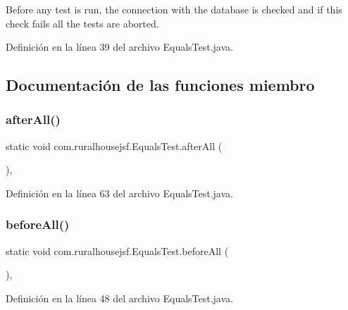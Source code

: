 Before any test is run, the connection with the database is checked and if this check fails all the tests are aborted. 

Definición en la línea 39 del archivo Equals\+Test.\+java.



\subsection{Documentación de las funciones miembro}
\mbox{\label{a00248_afea5be25670fd0d03ebb37e737bda19b}} 
\subsubsection{\texorpdfstring{afterAll()}{afterAll()}}
{\footnotesize\ttfamily static void com.\+ruralhousejsf.\+Equals\+Test.\+after\+All (\begin{DoxyParamCaption}{ }\end{DoxyParamCaption})\hspace{0.3cm}{\ttfamily [static]}, {\ttfamily [package]}}



Definición en la línea 63 del archivo Equals\+Test.\+java.

\mbox{\label{a00248_a114c96cfa4dbde48a42802952f8cd5b0}} 
\subsubsection{\texorpdfstring{beforeAll()}{beforeAll()}}
{\footnotesize\ttfamily static void com.\+ruralhousejsf.\+Equals\+Test.\+before\+All (\begin{DoxyParamCaption}{ }\end{DoxyParamCaption})\hspace{0.3cm}{\ttfamily [static]}, {\ttfamily [package]}}



Definición en la línea 48 del archivo Equals\+Test.\+java.

\mbox{\label{a00248_ac6b6f6de31519a6882e0ec812b03442c}} 
